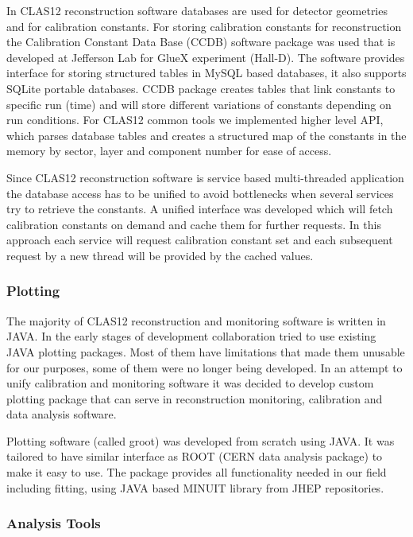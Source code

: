\documentclass{elsart}
\begin{document}
In CLAS12 reconstruction software databases are used for detector geometries and for calibration constants. For
storing calibration constants for reconstruction the Calibration Constant Data Base (CCDB) software package was used
that is developed at Jefferson Lab for GlueX experiment (Hall-D). The software provides interface for storing
structured tables in MySQL based databases, it also supports SQLite portable databases. CCDB package creates
tables that link constants to specific run (time) and will store different variations of constants depending on run
conditions. For CLAS12 common tools we implemented higher level API, which parses database tables and creates a
structured map of the constants in the memory by sector, layer and component number for ease of access.

Since CLAS12 reconstruction software is service based multi-threaded application the database access has to be unified
to avoid bottlenecks when several services try to retrieve the constants. A unified interface was developed which will
fetch calibration constants on demand and cache them for further requests. In this approach each service will request
calibration constant set and each subsequent request by a new thread will be provided by the cached values.

\subsubsection{Plotting}

The majority of CLAS12 reconstruction and monitoring software is written in JAVA. In the early stages of development
collaboration tried to use existing JAVA plotting packages. Most of them have limitations that made them unusable for
our purposes, some of them were no longer being developed. In an attempt to unify calibration and monitoring software
it was decided to develop custom plotting package that can serve in reconstruction monitoring, calibration and data analysis
software.

Plotting software (called groot) was developed from scratch using JAVA. It was tailored to have similar interface as ROOT
(CERN data analysis package) to make it easy to use. The package provides all functionality needed in our field including
fitting, using JAVA based MINUIT library from JHEP repositories.

\subsubsection{Analysis Tools}
\end{document}
